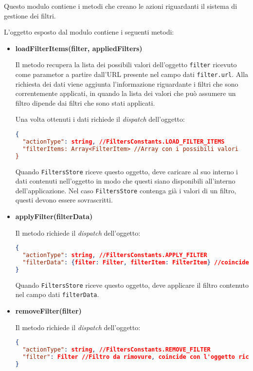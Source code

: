 
Questo modulo contiene i metodi che creano le azioni riguardanti il sistema di gestione dei filtri.

L'oggetto esposto dal modulo contiene i seguenti metodi:
\begin{itemize}
\item \textbf{loadFilterItems(filter, appliedFilters)}

Il metodo recupera la lista dei possibili valori dell'oggetto \texttt{filter} ricevuto come parametor a partire dall'URL presente nel campo dati \texttt{filter.url}. 
Alla richiesta dei dati viene aggiunta l'informazione riguardante i filtri che sono correntemente applicati, in quando la lista dei valori che può assumere un filtro dipende dai filtri che sono stati applicati.

Una volta ottenuti i dati richiede il \textit{dispatch} dell'oggetto:
\begin{lstlisting}[language=JSON, caption=Action: load filter items]
{
  "actionType": string, //FiltersConstants.LOAD_FILTER_ITEMS
  "filterItems: Array<FilterItem> //Array con i possibili valori
}
\end{lstlisting}

Quando \texttt{FiltersStore} riceve questo oggetto, deve caricare al suo interno i dati contenuti nell'oggetto in modo che questi siano disponibili all'interno dell'applicazione. Nel caso \texttt{FiltersStore} contenga già i valori di un filtro, questi devono essere sovrascritti.

\item \textbf{applyFilter(filterData)}

Il metodo richiede il \textit{dispatch} dell'oggetto:
\begin{lstlisting}[language=JSON, caption=Action: apply filter]
{
  "actionType": string, //FiltersConstants.APPLY_FILTER
  "filterData": {filter: Filter, filterItem: FilterItem} //coincide con l'oggetto ricevuto come parametro
}
\end{lstlisting}

Quando \texttt{FiltersStore} riceve questo oggetto, deve applicare il filtro contenuto nel campo dati \texttt{filterData}.

\item \textbf{removeFilter(filter)}

Il metodo richiede il \textit{dispatch} dell'oggetto:
\begin{lstlisting}[language=JSON, caption=Action: remove filter]
{
  "actionType": string, //FiltersConstants.REMOVE_FILTER
  "filter": Filter //Filtro da rimovure, coincide con l'oggetto ricevuto come parametro
}
\end{lstlisting}


\end{itemize}
